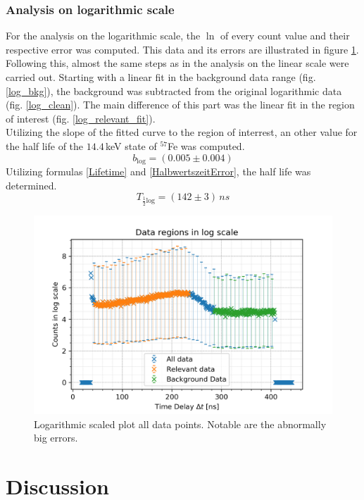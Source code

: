 \documentclass[30pt,a4paper]{article}
\begin{document}
	\subsubsection{Analysis on logarithmic scale}
	For the analysis on the logarithmic scale, the $\ln$ of every count value and their
	respective error was computed. This data and its errors are illustrated in figure 
	\ref{data_log}. Following this, almost the same steps as in the analysis on the linear scale
	were carried out. Starting with a linear fit in the background data range (fig. \ref{log_bkg}), the background was subtracted from the original logarithmic data (fig. \ref{log_clean}). The main difference of this part was the linear fit 
	in the region of interest (fig. \ref{log_relevant_fit}).\\
	Utilizing the slope of the fitted curve to the region of interrest, an other value for the half life of the $14.4$\,keV state of $^{57}$Fe was computed.
	$$b_{\textrm{log}} = (0.005\pm0.004)$$
	Utilizing formulas \ref{Lifetime} and \ref{HalbwertszeitError}, the half life was
	determined.
	$$T_{\frac{1}{2} \textrm{log}} = (142\pm 3)\,ns$$
	
	\begin{figure}[h]
		\includegraphics{Bilder/data_log}
		\centering
		\caption[Data with on logarithmic scale]{\small Logarithmic scaled plot all data points.
			 Notable are the abnormally big errors.}
		\label{data_log}
	\end{figure}
	
 	\FloatBarrier
 	\section{Discussion}
\end{document}
